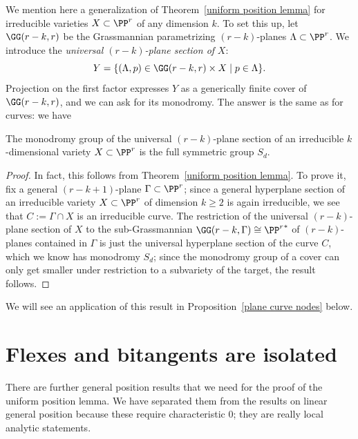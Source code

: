 We mention here a generalization of Theorem~\ref{uniform position lemma} for irreducible varieties $X \subset \PP^r$ of any dimension $k$. To set this up, let $\GG(r-k,r)$ be the Grassmannian parametrizing $(r-k)$-planes $\Lambda \subset \PP^r$. We introduce the \emph{universal $(r-k)$-plane section of} $X$:
$$
Y = \{ (\Lambda, p) \in \GG(r-k,r) \times X \mid p \in \Lambda \}.
$$
Projection on the first factor expresses $Y$ as a generically finite cover of $\GG(r-k,r)$, and we can ask for its monodromy. The answer is the same as for curves: we have


\begin{theorem}\label{higher dim uniform position lemma}
The monodromy group of the universal $(r-k)$-plane section of an irreducible $k$-dimensional variety $X \subset \PP^r$ is the full symmetric group $S_d$.
\end{theorem}

\begin{proof}
In fact, this follows from Theorem~\ref{uniform position lemma}. To prove it, fix a general $(r-k+1)$-plane $\Gamma \subset \PP^r$; since a general hyperplane section of an irreducible variety $X \subset \PP^r$ of dimension $k \geq 2$ is again irreducible, we see that $C := \Gamma \cap X$ is an irreducible curve. The restriction of the universal $(r-k)$-plane section of $X$ to the sub-Grassmannian $\GG(r-k, \Gamma) \cong {\PP^r}^*$ of $(r-k)$-planes contained in $\Gamma$ is just the universal hyperplane section of the curve $C$, which we know has monodromy $S_d$; since the monodromy group of a cover can only get smaller under restriction to a subvariety of the target, the result follows.
\end{proof}

We will see an application of this result in Proposition~\ref{plane curve nodes} below.


\section{Flexes and bitangents are isolated}\label{isolated flexes and bitangents}

There are  further general position results that we need for the proof of the uniform position lemma.  We have separated
them from the results on linear general position because these require characteristic 0; they are really local analytic
statements.


